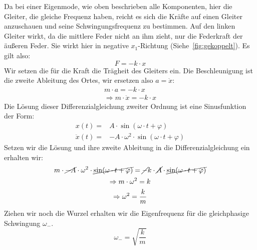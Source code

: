 \documentclass{article}
\begin{document}
                  Da bei einer Eigenmode, wie oben beschrieben alle Komponenten, hier die Gleiter, die gleiche Frequenz haben, reicht es sich die Kräfte auf
                  einen Gleiter anzuschauen und seine Schwingungsfrequenz zu bestimmen.
                  Auf den linken Gleiter wirkt, da die mittlere Feder nicht an ihm zieht, nur die Federkraft der äußeren Feder.
                  Sie wirkt hier in negative \(x_1\)-Richtung (Siehe~\ref{fig:gekoppelt}). Es gilt also:
                  \begin{equation}
                      F = -k \cdot x
                  \end{equation}
                  Wir setzen die für die Kraft die Trägheit des Gleiters ein. Die Beschleunigung ist die zweite Ableitung des Ortes, wir ersetzen also \( a = \ddot{x} \):
                  \begin{equation}
                      \begin{gathered}
                          m \cdot a = -k \cdot x \\
                          \Rightarrow m \cdot \ddot{x} = -k \cdot x
                      \end{gathered}
                  \end{equation}
                  Die Lösung dieser Differenzialgleichung zweiter Ordnung ist eine Sinusfunktion der Form:
                  \begin{equation}
                      \begin{aligned}\label{eq:ansatz}
                          x(t) =        & A \cdot \sin( \omega \cdot t + \varphi )                 \\
                          \ddot{x}(t) = & -A \cdot \omega^2 \cdot \sin( \omega \cdot t + \varphi )
                      \end{aligned}
                  \end{equation}
                  Setzen wir die Lösung und ihre zweite Ableitung in die Differenzialgleichung ein erhalten wir:
                  \begin{equation}
                      \begin{gathered}
                          m \cdot \cancel{-A} \cdot \omega^2 \cdot \cancel{\sin( \omega \cdot t + \varphi)} = \cancel{-}k \cdot \cancel{A} \cdot \cancel{\sin( \omega \cdot t + \varphi )} \\
                          \Rightarrow m \cdot \omega^2 = k \\
                          \Rightarrow \omega^2 = \frac{k}{m} \\
                      \end{gathered}
                  \end{equation}
                  Ziehen wir noch die Wurzel erhalten wir die Eigenfrequenz für die gleichphasige Schwingung \(\omega_{-}\).
                  \begin{equation}\label{eq:omega_minus}
                      \omega_{-} = \sqrt{ \frac{k}{m} }
                  \end{equation}
\end{document}
